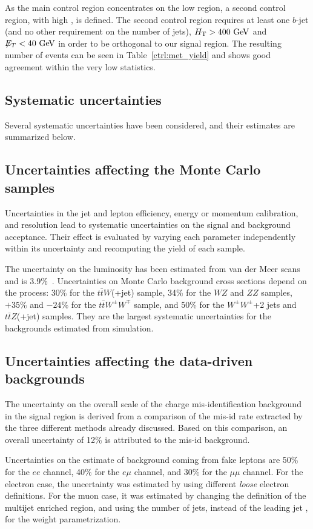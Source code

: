 As the main control region concentrates on the low
\HT{} region, a second control region, with high \HT{}, is defined.
The second control region requires at least one $b$-jet 
(and no other requirement on the number of jets), 
$\HT>400 \GeV$ and $\met<40 \GeV$ in order to be
orthogonal to our signal region. The resulting number of events can be seen in Table~\ref{ctrl:met_yield}
and shows good agreement within the very low statistics.

\subsection{Systematic uncertainties}\label{sect:syst}
Several systematic uncertainties have been considered, and their estimates are summarized below.

\subsection{Uncertainties affecting the Monte Carlo samples}
Uncertainties in the jet and lepton efficiency,
energy or momentum calibration, and resolution lead to systematic uncertainties on the signal
and background acceptance. Their effect is evaluated by varying each parameter independently
within its uncertainty and recomputing the yield of each sample.

The uncertainty on the luminosity has been estimated from van der Meer 
scans and is 3.9\%~\cite{Aad:2011dr,ATLAS-CONF-2011-116}. 
Uncertainties on Monte Carlo background cross sections depend on the process:
30\% for the $t\bar{t}W$(+jet) sample, 34\% for the $WZ$ and $ZZ$ samples,
$+35$\% and $-24$\% for the $t\bar{t}W^{\pm}W^{\mp}$ sample, and
50\% for the $W^{\pm}W^{\pm}$+2 jets
and $t\bar{t}Z$(+jet) samples. They are the largest systematic uncertainties for the
backgrounds estimated from simulation.

\subsection{Uncertainties affecting the data-driven backgrounds}

The uncertainty on the overall scale of the charge mis-identification background in the signal region 
is derived  from a comparison of the mis-id rate extracted by the three different methods already
discussed. Based on this comparison, an overall uncertainty of 12\% is attributed to the mis-id background.

Uncertainties on the estimate of background coming from fake leptons are 50\% for the $ee$ 
channel, 40\% for the $e\mu$ channel, and 30\% for the $\mu\mu$ channel.
For the electron case, the uncertainty was estimated by using different {\it loose} electron 
definitions. For the muon case, it was estimated by changing the definition of the multijet 
enriched region, and using the number of jets, instead of the leading jet \pT{}, for the
weight parametrization.

